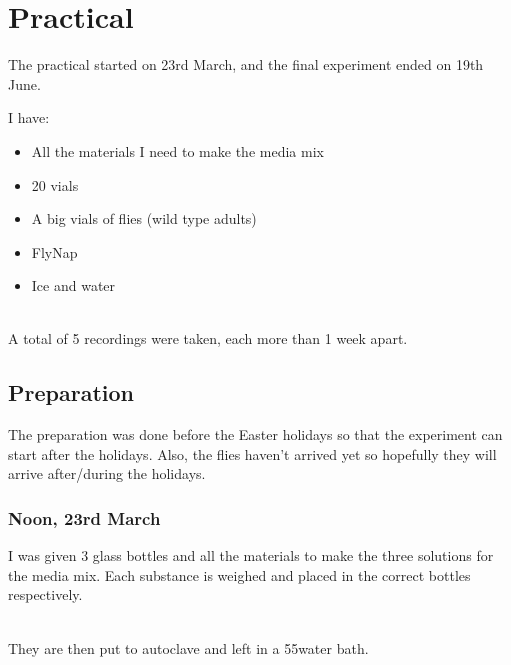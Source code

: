 \documentclass{article}
\begin{document}
\newpage

\section{Practical}

The practical started on 23rd March, and the final experiment ended on 19th June.

I have:\\

\begin{itemize}
  \item All the materials I need to make the media mix
  \item 20 vials
  \item A big vials of flies (wild type adults)
  \item FlyNap
  \item Ice and water
\end{itemize}

\noindent\\
A total of 5 recordings were taken, each more than 1 week apart.

\subsection{Preparation}

The preparation was done before the Easter holidays so that the experiment can start after the holidays. Also, the flies haven't arrived yet so hopefully they will arrive after/during the holidays.

\subsubsection{Noon, 23rd March}

I was given 3 glass bottles and all the materials to make the three solutions for the media mix. Each substance is weighed and placed in the correct bottles respectively.

\noindent\\
They are then put to autoclave and left in a 55\textcelsius\space water bath.

\begin{figure}[ht]
  \centering
  \hfill
\end{figure}
\end{document}
